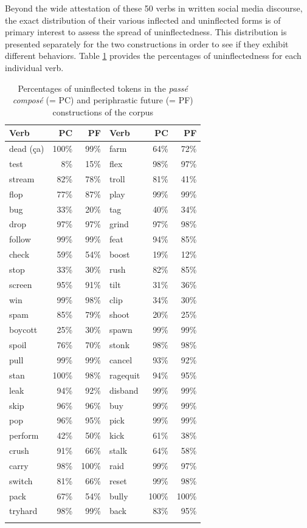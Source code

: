 \documentclass[output=paper,colorlinks,citecolor=brown]{langscibook}
\begin{document}
Beyond the wide attestation of these 50 verbs in  written social media discourse, the exact distribution of their various inflected and uninflected forms is of primary interest to assess the spread of uninflectedness. This distribution is presented separately for the two constructions in order to see if they exhibit different behaviors. Table \ref{09tab1} provides the percentages of uninflectedness for each individual verb.

\begin{table}[ht]
	\centering
	\begin{tabularx}{0.9\textwidth}{XrrXrr}
		\lsptoprule
			Verb & PC & PF & Verb & PC & PF \\
		\midrule
			dead (ça) & 100\% & 99\% & farm & 64\% & 72\% \\
			test & 8\% & 15\% & flex & 98\% & 97\% \\
			stream & 82\% & 78\% & troll & 81\% & 41\% \\
			flop & 77\% & 87\% & play & 99\% & 99\% \\
			bug & 33\% & 20\% & tag & 40\% & 34\% \\
			drop & 97\% & 97\% & grind & 97\% & 98\% \\
			follow & 99\% & 99\% & feat & 94\% & 85\% \\
			check & 59\% & 54\% & boost & 19\% & 12\% \\
			stop & 33\% & 30\% & rush & 82\% & 85\% \\
			screen & 95\% & 91\% & tilt & 31\% & 36\% \\
			win & 99\% & 98\% & clip & 34\% & 30\% \\
			spam & 85\% & 79\% & shoot & 20\% & 25\% \\
			boycott & 25\% & 30\% & spawn & 99\% & 99\% \\
			spoil & 76\% & 70\% & stonk & 98\% & 98\% \\
			pull & 99\% & 99\% & cancel & 93\% & 92\% \\
			stan & 100\% & 98\% & ragequit & 94\% & 95\% \\
			leak & 94\% & 92\% & disband & 99\% & 99\% \\
			skip & 96\% & 96\% & buy & 99\% & 99\% \\
			pop & 96\% & 95\% & pick & 99\% & 99\% \\
			perform & 42\% & 50\% & kick & 61\% & 38\% \\
			crush & 91\% & 66\% & stalk & 64\% & 58\% \\
			carry & 98\% & 100\% & raid & 99\% & 97\% \\
			switch & 81\% & 66\% & reset & 99\% & 98\% \\
			pack & 67\% & 54\% & bully & 100\% & 100\% \\
			tryhard & 98\% & 99\% & back & 83\% & 95\% \\
		\lspbottomrule
	\end{tabularx}
	\caption{Percentages of uninflected tokens in the \emph{passé composé} (= PC) and periphrastic future (= PF) constructions of the corpus}
	\label{09tab1}
\end{table}
\end{document}
